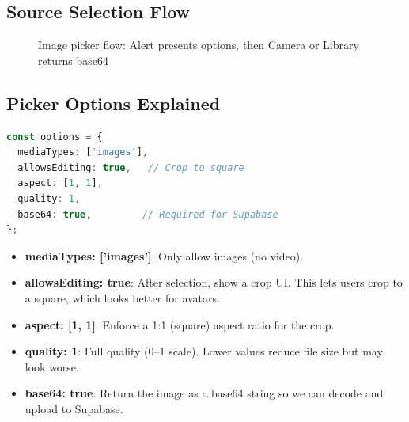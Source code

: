 \documentclass[11pt,a4paper]{article}
\begin{document}
\subsection{Source Selection Flow}

\begin{figure}[h]
\centering
{}
\caption{Image picker flow: Alert presents options, then Camera or Library returns base64}
\end{figure}

\subsection{Picker Options Explained}

\begin{lstlisting}[language=TypeScript, caption=Image Picker Configuration]
const options = {
  mediaTypes: ['images'],
  allowsEditing: true,   // Crop to square
  aspect: [1, 1],
  quality: 1,
  base64: true,         // Required for Supabase
};
\end{lstlisting}

\begin{itemize}[leftmargin=*]
    \item \textbf{mediaTypes: ['images']}: Only allow images (no video).
    \item \textbf{allowsEditing: true}: After selection, show a crop UI. This lets users crop to a square, which looks better for avatars.
    \item \textbf{aspect: [1, 1]}: Enforce a 1:1 (square) aspect ratio for the crop.
    \item \textbf{quality: 1}: Full quality (0--1 scale). Lower values reduce file size but may look worse.
    \item \textbf{base64: true}: Return the image as a base64 string so we can decode and upload to Supabase.
\end{itemize}
\end{document}
